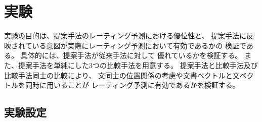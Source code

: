 \section{実験} \label{sec:Experiments}

実験の目的は、提案手法のレーティング予測における優位性と、
提案手法に反映されている意図が実際にレーティング予測において有効であるかの
検証である。
具体的には、提案手法が従来手法\cite{fujitani15}に対して
優れているかを検証する。
また、提案手法を単純にした3つの比較手法を用意する。
提案手法と比較手法及び比較手法同士の比較により、
文同士の位置関係の考慮や文書ベクトルと文ベクトルを同時に用いることが
レーティング予測に有効であるかを検証する。


\subsection{実験設定}

